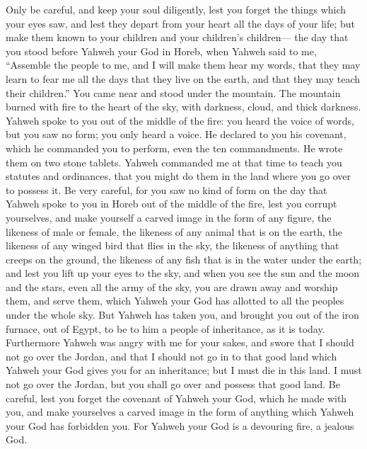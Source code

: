  Only be careful, and keep your soul diligently, lest you
forget the things which your eyes saw, and lest they depart from your
heart all the days of your life; but make them known to your children
and your children's children---  the day that you stood
before Yahweh your God in Horeb, when Yahweh said to me, ``Assemble the
people to me, and I will make them hear my words, that they may learn to
fear me all the days that they live on the earth, and that they may
teach their children.''  You came near and stood under
the mountain. The mountain burned with fire to the heart of the sky,
with darkness, cloud, and thick darkness.  Yahweh spoke
to you out of the middle of the fire: you heard the voice of words, but
you saw no form; you only heard a voice.  He declared to
you his covenant, which he commanded you to perform, even the ten
commandments. He wrote them on two stone tablets.  Yahweh
commanded me at that time to teach you statutes and ordinances, that you
might do them in the land where you go over to possess it.
 Be very careful, for you saw no kind of form on the day
that Yahweh spoke to you in Horeb out of the middle of the fire,
 lest you corrupt yourselves, and make yourself a carved
image in the form of any figure, the likeness of male or female,
 the likeness of any animal that is on the earth, the
likeness of any winged bird that flies in the sky,  the
likeness of anything that creeps on the ground, the likeness of any fish
that is in the water under the earth;  and lest you lift
up your eyes to the sky, and when you see the sun and the moon and the
stars, even all the army of the sky, you are drawn away and worship
them, and serve them, which Yahweh your God has allotted to all the
peoples under the whole sky.  But Yahweh has taken you,
and brought you out of the iron furnace, out of Egypt, to be to him a
people of inheritance, as it is today.  Furthermore
Yahweh was angry with me for your sakes, and swore that I should not go
over the Jordan, and that I should not go in to that good land which
Yahweh your God gives you for an inheritance;  but I must
die in this land. I must not go over the Jordan, but you shall go over
and possess that good land.  Be careful, lest you forget
the covenant of Yahweh your God, which he made with you, and make
yourselves a carved image in the form of anything which Yahweh your God
has forbidden you.  For Yahweh your God is a devouring
fire, a jealous God.

